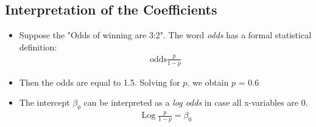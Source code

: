 \documentclass[12pt, oneside]{article}
\newcommand*{\Log}{\operatorname{Log}}
\begin{document}
\subsection{Interpretation of the Coefficients}
\begin{itemize}
    \item Suppose the "Odds of winning are 3:2". The word \emph{odds} has a formal statistical definition:
    \begin{align*}
        \text{odds} \frac{p}{1-p}
    \end{align*}
    \item Then the odds are equal to 1.5. Solving for $p$, we obtain $p$ = 0.6
    \item The intercept $\beta_0$ can be interpreted as a \emph{log odds} in case all x-variables are 0.
    \begin{align*}
        \Log\frac{p}{1-p} = \beta_0
    \end{align*}


\end{itemize}
\end{document}
